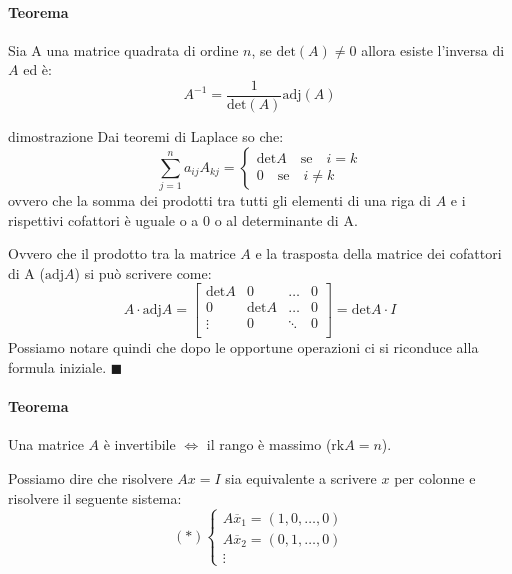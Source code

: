 \documentclass[x11names]{article}
\newcommand*{\QEDA}{\null\nobreak\hfill\ensuremath{\blacksquare}}%
\begin{document}
\begin{center}
\colorbox{Bisque1}{\begin{minipage}{5.75in}
\paragraph{Teorema} 
Sia A una matrice quadrata di ordine $n$, se $\text{det}(A) \neq 0$ allora esiste l’inversa di $A$ ed è:
$$
A^{-1} = \frac{1}{\text{det}(A)}\text{adj}(A)
$$
\end{minipage}}        
\end{center}

\begin{es}{dimostrazione}
Dai teoremi di Laplace so che:
\[
	\sum_{j=1}^n a_{ij}A_{kj} = \left\{\begin{array}{c} \text{det}A \quad \text{se} \quad i = k \\ 0 \quad \text{se}\quad i \neq k \end{array} \right
.\] 
ovvero che la somma dei prodotti tra tutti gli elementi di una riga di $A$ e i rispettivi cofattori è uguale o a $0$ o al determinante di A.

Ovvero che il prodotto tra la matrice $A$ e la trasposta della matrice dei cofattori di A ($\text{adj}A$) si può scrivere come:
\[
A \cdot \text{adj}A = \begin{bmatrix}
	\text{det}A & 0 & \dots & 0 \\
	0 & \text{det}A & \dots & 0\\
	\vdots & 0 &  \ddots & 0 \\

\end{bmatrix}
= \text{det}A \cdot I
\]
Possiamo notare quindi che dopo le opportune operazioni ci si riconduce alla formula iniziale.
\QEDA
\end{es}


\begin{center}
\colorbox{Bisque1}{\begin{minipage}{5.75in}

\paragraph{Teorema}
Una matrice $A$ è invertibile  $\Longleftrightarrow$ il rango è massimo ($\text{rk}A = n$).

Possiamo dire che risolvere $Ax = I$ sia equivalente a scrivere  $x$ per colonne e risolvere il seguente sistema:
\[
	\left(*\right) \left\{ \begin{array}{c} A\overline{x}_{1} = \left(1,0,\dots,0\right) \\ A\overline{x}_{2} = \left(0,1,\dots,0\right) \\ \vdots\end{array}\right
.\] 
\end{minipage}}        
\end{center}
\end{document}
